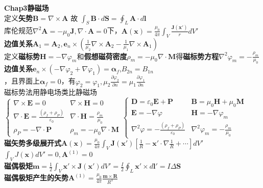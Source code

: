 \documentclass[10pt,a4paper]{article}
\begin{document}
\begin{multicols}{2}
\noindent\textbf{Chap3静磁场}\\
定义\textbf{矢势}$\bm{B}=\nabla\times\bm{A}$ 故 $\int_S\bm{B}\cdot d\bm{S}=\oint_L\bm{A}\cdot d\bm{l}$\\
库伦规范$\nabla^2\bm{A}=-\mu_0\bm{J},\nabla\cdot\bm{A}=0$下，$\bm{A}(\bm{x})=\frac{\mu_0}{4\pi}\int_V\frac{\bm{J}(\bm{x}')}{r}dV'$\\
\textbf{边值关系}$\bm{A}_1=\bm{A}_2,\bm{e}_n\times(\frac{1}{\mu_2}\nabla\times\bm{A}_2-\frac{1}{\mu_1}\nabla\times\bm{A}_1)$\\
定义\textbf{磁标势}$\bm{H}=-\nabla\varphi_m$和\textbf{假想磁荷密度}$\rho_m=-\mu_0\nabla\cdot\bm{M}$得\textbf{磁标势方程}$\nabla^2\varphi_m=-\frac{\rho_m}{\mu_0}$\\
\textbf{边值关系}$\bm{e}_n\times(-\nabla\varphi_2+\nabla\varphi_1)=\bm{\alpha}_f$,$B_{2n}=B_{1n}$\\
，且界面上$\bm{\alpha}_f=0$，有$\varphi_2=\varphi_1,\mu_2\frac{\partial\varphi_2}{\partial n}=\mu_1\frac{\partial\varphi_1}{\partial n}$\\
磁标势法用静电场类比静磁场\\
\tiny$\left\{\begin{array}{ll}\nabla\times\bm{E}=0&\nabla\times\bm{H}=0\\\nabla\cdot\bm{E}=\frac{(\rho_f+\rho_P)}{\varepsilon_0}&\nabla\cdot\bm{H}=\frac{\rho_m}{\mu_0}\\\rho_P=-\nabla\cdot\bm{P}&\rho_m=-\mu_0\nabla\cdot\bm{M}\end{array}\right.\left\{\begin{array}{ll}\bm{D}=\varepsilon_0\bm{E}+\bm{P}&\bm{B}=\mu_0\bm{H}+\mu_0\bm{M}\\\bm{E}=-\nabla\varphi&\bm{H}=-\nabla\varphi_m\\\nabla^2\varphi=-\frac{(\rho_f+\rho_P)}{\varepsilon_0}&\nabla^2\varphi_m=-\frac{\rho_m}{\mu_0}\end{array}\right.$\scriptsize\\
\textbf{磁矢势多级展开式}$\bm{A}(\bm{x})=\frac{\mu_0}{4\pi}\int_V\bm{J}(\bm{x}')[\frac{1}{R}-\bm{x}'\cdot\nabla\frac{1}{R}+\cdots]dV'$\\
$\int_VJ(\bm{x})dV'=0,\bm{A}^{(1)}=0$\\
\indent\indent\textbf{磁偶极矩}$\bm{m}=\frac{1}{2}\int_V\bm{x}'\times\bm{J}(\bm{x}')dV'=\frac{I}{2}\oint_L\bm{x}'\times d\bm{l}'=I\Delta\bm{S}$\\
\indent\indent\textbf{磁偶极矩产生的矢势}$\bm{A}^{(1)}=\frac{\mu_0}{4\pi}\frac{\bm{m}\times\bm{R}}{R^3}$\\

\end{multicols}
\end{document}
